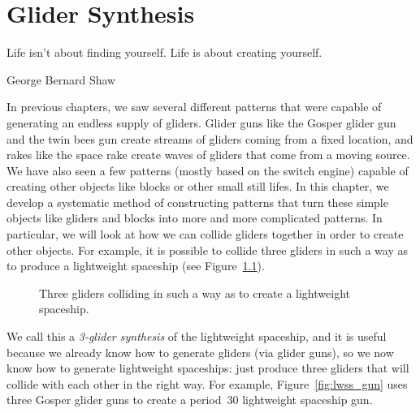 
\renewcommand{\chapterfolder}{glider_synthesis/}
\chapter{Glider Synthesis}\label{chp:glider_synthesis}


\vspace*{-0.4in}
\epigraph{Life isn't about finding yourself. Life is about creating yourself.}{George Bernard Shaw}
\vspace*{0.4in}



\noindent In previous chapters, we saw several different patterns that were capable of generating an endless supply of gliders. Glider guns like the Gosper glider gun and the twin bees gun create streams of gliders coming from a fixed location, and rakes like the space rake create waves of gliders that come from a moving source. We have also seen a few patterns (mostly based on the switch engine) capable of creating other objects like blocks or other small still lifes. In this chapter, we develop a systematic method of constructing patterns that turn these simple objects like gliders and blocks into more and more complicated patterns. In particular, we will look at how we can collide gliders together in order to create other objects. For example, it is possible to collide three gliders in such a way as to produce a lightweight spaceship (see Figure~\ref{fig:lwss_3_gliders}).
\begin{figure}[!ht]
	\centering{}
	\caption{Three gliders colliding in such a way as to create a lightweight spaceship.}\label{fig:lwss_3_gliders}
\end{figure}

We call this a \emph{3-glider synthesis} of the lightweight spaceship, and it is useful because we already know how to generate gliders (via glider guns), so we now know how to generate lightweight spaceships: just produce three gliders that will collide with each other in the right way. For example, Figure~\ref{fig:lwss_gun} uses three Gosper glider guns to create a period~30 lightweight spaceship gun.

